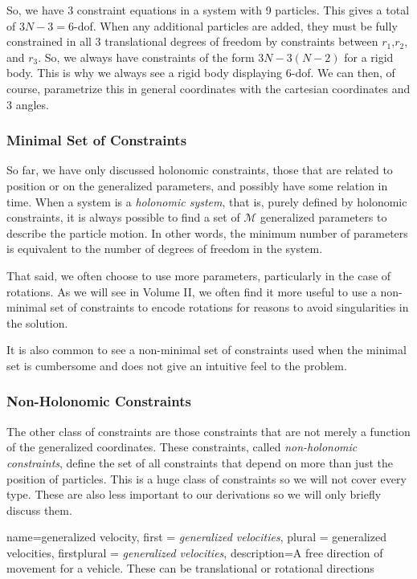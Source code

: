 \documentclass[12pt]{report}
\begin{document}
So, we have 3 constraint equations in a system with 9 particles. This gives a total of $3N-3=6$-\gls{dof}. When any additional particles are added, they must be fully constrained in all 3 translational degrees of freedom by constraints between $r_1$,$r_2$, and $r_3$. So, we always have constraints of the form $3N-3(N-2)$ for a rigid body. This is why we always see a rigid body displaying 6-\gls{dof}. We can then, of course, parametrize this in general coordinates with the cartesian coordinates and 3 angles.

\subsubsection{Minimal Set of Constraints}
So far, we have only discussed holonomic constraints, those that are related to position or on the generalized parameters, and possibly have some relation in time. When a system is a \textit{holonomic system}, that is, purely defined by holonomic constraints, it is always possible to find a set of $\mathcal{M}$ generalized parameters to describe the particle motion. In other words, the minimum number of parameters is equivalent to the number of degrees of freedom in the system.

That said, we often choose to use more parameters, particularly in the case of rotations. As we will see in Volume II, we often find it more useful to use a non-minimal set of constraints to encode rotations for reasons to avoid singularities in the solution.

It is also common to see a non-minimal set of constraints used when the minimal set is cumbersome and does not give an intuitive feel to the problem.
\subsubsection{Non-Holonomic Constraints}
The other class of constraints are those constraints that are not merely a function of the generalized coordinates. These constraints, called \textit{non-holonomic constraints}, define the set of all constraints that depend on more than just the position of particles. This is a huge class of constraints so we will not cover every type. These are also less important to our derivations so we will only briefly discuss them.

{
    name=generalized velocity,
    first = {\textit{generalized velocities}},
    plural = {generalized velocities},
    firstplural = {\textit{generalized velocities}},
    description={A free direction of movement for a vehicle. These can be translational or rotational directions}
}
\end{document}
